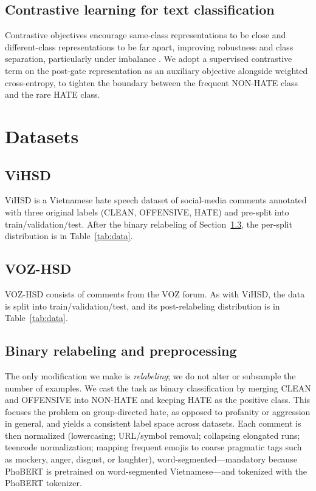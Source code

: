 \documentclass[11pt]{article}
\begin{document}
\subsection{Contrastive learning for text classification}
Contrastive objectives encourage same-class representations to be close and different-class representations to be far apart, improving robustness and class separation, particularly under imbalance \citep{supcon}. We adopt a supervised contrastive term on the post-gate representation as an auxiliary objective alongside weighted cross-entropy, to tighten the boundary between the frequent NON-HATE class and the rare HATE class.

\section{Datasets}

\subsection{ViHSD}
ViHSD \citep{vihsd} is a Vietnamese hate speech dataset of social-media comments annotated with three original labels (CLEAN, OFFENSIVE, HATE) and pre-split into train/validation/test. After the binary relabeling of Section~\ref{sec:reshape}, the per-split distribution is in Table~\ref{tab:data}.

\subsection{VOZ-HSD}
VOZ-HSD \citep{vozhsd} consists of comments from the VOZ forum. As with ViHSD, the data is split into train/validation/test, and its post-relabeling distribution is in Table~\ref{tab:data}.

\subsection{Binary relabeling and preprocessing}
\label{sec:reshape}
The only modification we make is \emph{relabeling}; we do not alter or subsample the number of examples. We cast the task as binary classification by merging CLEAN and OFFENSIVE into NON-HATE and keeping HATE as the positive class. This focuses the problem on group-directed hate, as opposed to profanity or aggression in general, and yields a consistent label space across datasets. Each comment is then normalized (lowercasing; URL/symbol removal; collapsing elongated runs; teencode normalization; mapping frequent emojis to coarse pragmatic tags such as mockery, anger, disgust, or laughter), word-segmented---mandatory because PhoBERT is pretrained on word-segmented Vietnamese---and tokenized with the PhoBERT tokenizer.
\end{document}
